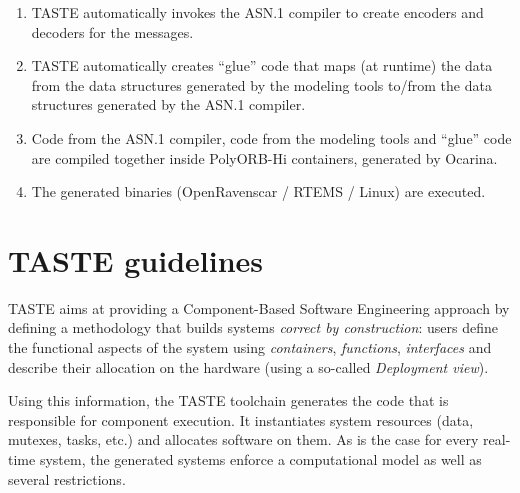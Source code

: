 \documentclass[11pt]{book}
\newcommand{\Concept}[1]{#1\xspace}
\newcommand{\taste}{\Concept{TASTE}}
\begin{document}
\begin{enumerate}
generated cannot interoperate as is; error-prone manual labour is required to ``glue'' the pieces together.
This is the source of many problems\footnote{Lost satellites being one
of them.}, which is why ASN.1 is used in TASTE: by placing it as the center of a star formation 
amongst all modeling tools, the ``glue-ing'' can be done automatically.
\item TASTE automatically invokes the ASN.1 compiler to create encoders and decoders for the messages.
\item TASTE automatically creates ``glue'' code that maps (at runtime) the data from
the data structures generated by the modeling tools to/from the data structures generated by the 
ASN.1 compiler.
\item Code from the ASN.1 compiler, code from the modeling tools and ``glue'' code are compiled
together inside PolyORB-Hi containers, generated by Ocarina.
\item The generated binaries (OpenRavenscar / RTEMS / Linux) are executed.
\end{enumerate}
   \section{\taste guidelines}
   \taste aims at providing a Component-Based Software Engineering approach
   by defining a methodology that builds systems \textit{correct by
   construction}: users define the functional aspects of the system using
   \textit{containers}, \textit{functions}, \textit{interfaces} and describe their
   allocation on the hardware (using a so-called \textit{Deployment view}).

   Using this information, the \taste toolchain generates the code that is
   responsible for component execution. It instantiates system resources (data,
   mutexes, tasks, etc.) and allocates software on them. As is the case for every 
   real-time system, the generated systems enforce a computational model as well as several
   restrictions.
\end{document}
